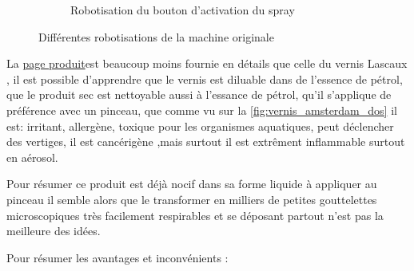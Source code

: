 \begin{figure}[H]
\begin{subfigure}{.5\textwidth}
        \caption{Robotisation du bouton d'activation du spray}
        \label{fig:vernis_amsterdam_dos}
    \end{subfigure}
    \caption{Différentes robotisations de la machine originale}
    \label{fig:Vernis_amsterdam_photos}
\end{figure}
La \href{https://www.amsterdam-acrylics.com/fr/catalogue/amsterdam-protection/vernis-acrylique-brillant-flacon-250ml/}{page produit}\footnotemark est beaucoup moins fournie en détails que celle du vernis Lascaux
, il est possible d'apprendre que le vernis est diluable dans de l'essence de pétrol, que le produit
sec est nettoyable aussi à l'essance de pétrol, qu'il s'applique de préférence avec un pinceau, que comme vu sur la \autoref{fig:vernis_amsterdam_dos} il est: irritant, allergène, toxique pour les organismes aquatiques, peut déclencher
des vertiges, il est cancérigène ,mais surtout il est extrêment inflammable surtout en aérosol.

Pour résumer ce produit est déjà nocif dans sa forme liquide à appliquer au pinceau il semble alors que le transformer en milliers de petites gouttelettes microscopiques très facilement respirables et se déposant partout
n'est pas la meilleure des idées.

Pour résumer les avantages et inconvénients :

\begin{table}[H]
    \centering
    \caption{Résumé des avantages et inconvénients du vernis Amsterdam}
    \label{tab:Amsterdam_vernis}
\end{table}

